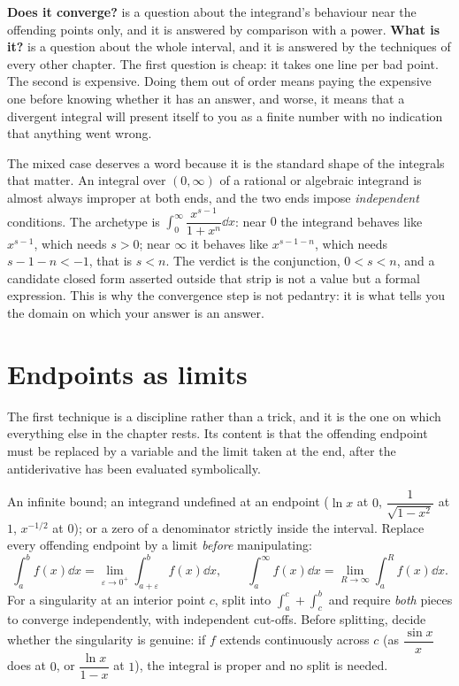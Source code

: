\begin{keynote}
\textbf{Does it converge?} is a question about the integrand's behaviour near the offending points only, and it is answered by comparison with a power. \textbf{What is it?} is a question about the whole interval, and it is answered by the techniques of every other chapter. The first question is cheap: it takes one line per bad point. The second is expensive. Doing them out of order means paying the expensive one before knowing whether it has an answer, and worse, it means that a divergent integral will present itself to you as a finite number with no indication that anything went wrong.
\end{keynote}

The mixed case deserves a word because it is the standard shape of the integrals that matter. An integral over $(0,\infty)$ of a rational or algebraic integrand is almost always improper at both ends, and the two ends impose \emph{independent} conditions. The archetype is $\int_0^{\infty}\dfrac{x^{s-1}}{1+x^{n}}\dd x$: near $0$ the integrand behaves like $x^{s-1}$, which needs $s>0$; near $\infty$ it behaves like $x^{s-1-n}$, which needs $s-1-n<-1$, that is $s<n$. The verdict is the conjunction, $0<s<n$, and a candidate closed form asserted outside that strip is not a value but a formal expression. This is why the convergence step is not pedantry: it is what tells you the domain on which your answer is an answer.

\section{Endpoints as limits}

The first technique is a discipline rather than a trick, and it is the one on which everything else in the chapter rests. Its content is that the offending endpoint must be replaced by a variable and the limit taken at the end, after the antiderivative has been evaluated symbolically.

\cue An infinite bound; an integrand undefined at an endpoint ($\ln x$ at $0$, $\dfrac{1}{\sqrt{1-x^{2}}}$ at $1$, $x^{-1/2}$ at $0$); or a zero of a denominator strictly inside the interval.
\method Replace every offending endpoint by a limit \emph{before} manipulating:
\[\int_a^bf(x)\dd x=\lim_{\varepsilon\to0^{+}}\int_{a+\varepsilon}^{b}f(x)\dd x,\qquad \int_a^{\infty}f(x)\dd x=\lim_{R\to\infty}\int_a^{R}f(x)\dd x.\]
For a singularity at an interior point $c$, split into $\int_a^{c}+\int_c^{b}$ and require \emph{both} pieces to converge independently, with independent cut-offs. Before splitting, decide whether the singularity is genuine: if $f$ extends continuously across $c$ (as $\dfrac{\sin x}{x}$ does at $0$, or $\dfrac{\ln x}{1-x}$ at $1$), the integral is proper and no split is needed.

